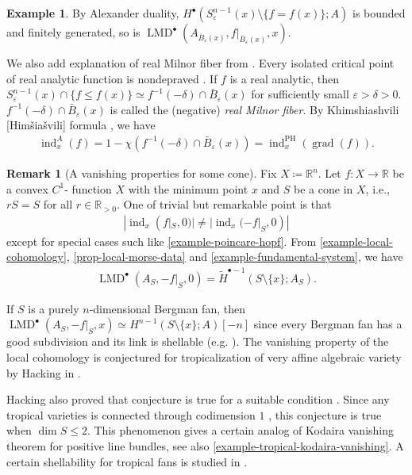 \documentclass[a4paper,dvipdfmx,reqno,12pt]{amsart}
\theoremstyle{definition}
\newtheorem{example}[theorem]{Example}
\newtheorem{remark}[theorem]{Remark}
\newcommand{\deq}{\coloneqq}
\newcommand{\vep}{\varepsilon}%
\newcommand{\opn}[1]{\operatorname{#1}}
\numberwithin{equation}{section}
\begin{document}
\begin{example}
By Alexander duality, 
$H^{\bullet}(S_{\varepsilon}^{n-1}(x)\setminus \{f=f(x)\};A)$ 
is bounded and finitely generated, so 
is $\opn{LMD}^{\bullet}(A_{\bar{B}_{\varepsilon}(x)},
f|_{\bar{B}_{\varepsilon}(x)},x)$.

We also add explanation of real Milnor fiber from
\cite[3.2]{MR3779558}. Every isolated critical point 
of real analytic function is nondepraved 
\cite[Part I.2.4]{MR932724}.
If $f$ is a real analytic, then 
$S_{\varepsilon}^{n-1}(x)\cap \{f\leq f(x)\}\simeq 
f^{-1}(-\delta)\cap \bar{B}_{\varepsilon}(x)$
for sufficiently small $\vep>\delta>0$.
$f^{-1}(-\delta)\cap \bar{B}_{\varepsilon}(x)$ is called 
the (negative) \emph{real Milnor fiber}.
By Khimshiashvili [Him\v{s}ia\v{s}vili] formula \cite{MR0458467}, we have
\begin{align} \label{equation-Khimshiashvili}
  \opn{ind}_x^{A}(f)
=1-\chi(f^{-1}(-\delta)\cap \bar{B}_{\varepsilon}(x))
=\opn{ind}^{\opn{PH}}_{x}(\opn{grad}(f)).
\end{align}

\end{example}

\begin{remark}[{A vanishing properties
for some cone}]
Fix $X\deq \mathbb{R}^{n}$.
Let $f\colon X\to {\mathbb{R}}$ be a convex $C^{1}$-
function $X$ with the minimum point $x$
and $S$ be a cone in $X$, i.e., 
$rS=S$ for all $r\in \mathbb{R}_{> 0}$.
One of trivial but remarkable point is that
\begin{align}
|\opn{ind}_x(f|_S,0)|\neq |\opn{ind}_x(-f|_S,0)|
\end{align}
except for special cases such like
\cref{example-poincare-hopf}.
From \cref{example-local-cohomology},
\cref{prop-local-morse-data} and
\cref{example-fundamental-system}, we have
\begin{align}
\opn{LMD}^{\bullet}(A_S,-f|_S,0)=
\tilde{H}^{\bullet-1}(S\setminus \{x\};A_{S}).
\end{align}



If $S$ is a purely $n$-dimensional Bergman fan, then 
$\opn{LMD}^{\bullet}(A_S,-f|_S,x)\simeq 
H^{n-1}(S\setminus\{x\};A)[-n]$ since every Bergman fan has a good subdivision 
\cite[Theorem 1]{MR2185977} and its link is shellable
(e.g. \cite[7.9.1. Theorem]{MR1165544}).
The vanishing property of the local cohomology is conjectured for
tropicalization of very affine algebraic variety by Hacking in
\cite{MR2452307}.

Hacking also proved that conjecture is true for a suitable condition
\cite[Theorem 2.5]{MR2452307}.
Since any tropical varieties is connected
through codimension $1$ \cite[Theorem 3.3.5]{MR3287221},
this conjecture is true when $\dim S \leq 2$.
This phenomenon gives a certain analog of Kodaira vanishing theorem for 
positive line bundles, see 
also \cref{example-tropical-kodaira-vanishing}. 
A certain shellability for tropical fans is studied in
\cite{amini2021homology}.
\end{remark}
\end{document}
